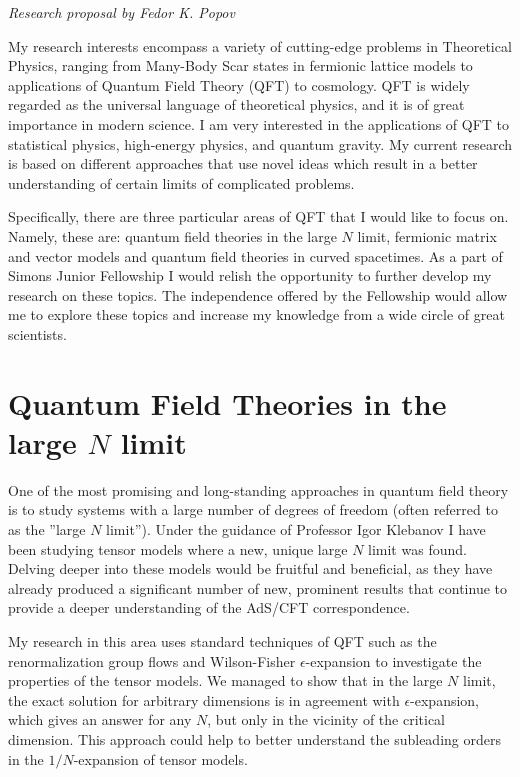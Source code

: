 \documentclass[11pt]{article}
\begin{document}
\begin{center}
\it
\large
Research proposal by
Fedor K. Popov

\end{center}

My research interests encompass a variety of cutting-edge problems in Theoretical Physics, ranging from Many-Body Scar states in fermionic lattice models to applications of Quantum Field Theory (QFT) to cosmology. QFT is widely regarded as the universal language of theoretical physics, and it is of great importance in modern science. 
I am very interested in the applications of QFT to statistical physics, high-energy physics, and quantum gravity.
My current research is based on different approaches that use novel ideas which result in a better understanding of certain limits of complicated problems.

Specifically, there are three particular areas of QFT that I would like to focus on. Namely, these are: quantum field theories in the large $N$ limit, fermionic matrix and vector models and quantum field theories in  curved spacetimes. As a part of Simons Junior Fellowship I would relish the opportunity to further develop my research on these topics. The independence
offered by the Fellowship would allow me to explore these topics and increase my knowledge from a wide circle of great scientists.

\section*{Quantum Field Theories in the large $N$ limit}
One of the most promising and long-standing approaches %
in quantum field theory is to study systems with a large number of degrees of freedom (often referred to as the ''large $N$ limit''). 
Under the guidance of Professor Igor Klebanov I have been studying tensor models where a new, unique large $N$ limit was found.
Delving deeper into these models would be fruitful and beneficial, as they have already produced a significant number of new, prominent results that continue to provide a deeper understanding of the AdS/CFT correspondence. 

My research in this area uses standard techniques of QFT such as the renormalization group flows and Wilson-Fisher $\epsilon$-expansion to investigate the properties of the tensor models.
We managed to show that in the large $N$ limit, the exact solution for arbitrary dimensions is in agreement with $\epsilon$-expansion, which gives an answer for any $N$, but only in the vicinity of the critical dimension. %
This approach could help to better understand the subleading orders in the $1/N$-expansion of tensor models.
\end{document}

